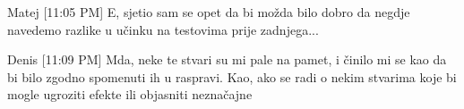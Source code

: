 \documentclass[../main.tex]{subfiles}
\begin{document}
Matej [11:05 PM]
E, sjetio sam se opet da bi možda bilo dobro da negdje navedemo razlike u učinku na testovima prije zadnjega...

Denis [11:09 PM]
Mda, neke te stvari su mi pale na pamet, i činilo mi se kao da bi bilo zgodno spomenuti ih u raspravi. Kao, ako se radi o nekim stvarima koje bi mogle ugroziti efekte ili objasniti neznačajne

	
\end{document}
